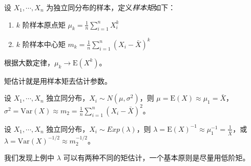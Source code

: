 \documentclass[../main.tex]{subfiles}
\begin{document}
设 $X_1,\cdots,X_n$ 为独立同分布的样本，定义\emph{样本矩}如下：
\begin{enumerate}
    \item $k$ 阶样本原点矩 $\mu_k=\frac1n\sum_{i=1}^nX_i^k$
    \item $k$ 阶样本中心矩 $m_k=\frac1n\sum_{i=1}^n(X_i-\bar X)^k$
\end{enumerate}

根据大数定律，$\mu_k\rightarrow\mathrm E(X^k)$。

矩估计就是用样本矩去估计参数。

\begin{example}
    设 $X_1,\cdots,X_n$ 独立同分布，$X_i\sim N(\mu,\sigma^2)$，则 $\mu=\mathrm E(X)\approx \mu_1=\bar X$，$\sigma^2=\mathrm{Var}(X)\approx m_2=\frac1n\sum_{i=1}^n(X_i-\bar X)^2$。
\end{example}

\begin{example}
    设 $X_1,\cdots,X_n$ 独立同分布，$X_i\sim Exp(\lambda)$，则 $\lambda=\mathrm E(X)^{-1}\approx \mu_1^{-1}=\frac1{\bar X}$，或 $\lambda=\mathrm{Var}(X)^{-1/2}\approx m_2^{-1/2}$。
\end{example}

我们发现上例中 $\lambda$ 可以有两种不同的矩估计，一个基本原则是尽量用低阶矩。


\end{document}

